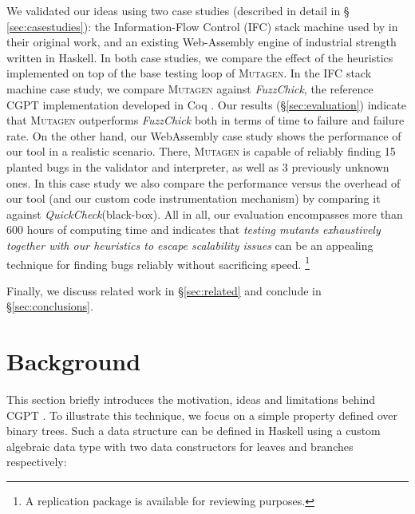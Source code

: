 \documentclass[sigconf,review,anonymous]{acmart}
\newcommand{\quickcheck}{\textit{QuickCheck}\xspace}
\newcommand{\fuzzchick}{\textit{FuzzChick}\xspace}
\newcommand{\mutagen}{\textsc{Mutagen}\xspace}
\begin{document}
We validated our ideas using two case studies (described in detail in \S
\ref{sec:casestudies}): the Information-Flow Control (IFC) stack machine used by
\citeauthor{lampropoulos2019coverage} in their original work, and an existing
{Web-Assembly} engine of industrial strength written in Haskell.
%
In both case studies, we compare the effect of the heuristics implemented on top
of the base testing loop of \mutagen.
%
In the IFC stack machine case study, we compare \mutagen against \fuzzchick, the
reference CGPT implementation developed in Coq \cite{lampropoulos2019coverage}.
%
Our results (\S \ref{sec:evaluation}) indicate that \mutagen outperforms
\fuzzchick both in terms of time to failure and failure rate.
%
On the other hand, our WebAssembly case study shows the performance of our tool
in a realistic scenario.
%
There, \mutagen is capable of reliably finding 15 planted bugs in the validator
and interpreter, as well as 3 previously unknown ones.
%
In this case study we also compare the performance versus the overhead of our
tool (and our custom code instrumentation mechanism) by comparing it against
\quickcheck (black-box).  
%
All in all, our evaluation encompasses more than 600 hours of computing time and
indicates that \emph{testing mutants exhaustively together with our heuristics
to escape scalability issues} can be an appealing technique for finding bugs
reliably without sacrificing speed.%
%
\footnote{A replication package \cite{anon_2021} is available for reviewing
  purposes.}

Finally, we discuss related work in \S \ref{sec:related} and conclude
in \S \ref{sec:conclusions}.



\section{Background}
\label{sec:background}

This section briefly introduces the motivation, ideas and limitations behind
CGPT \cite{lampropoulos2019coverage}.
%
To illustrate this technique, we focus on a simple property defined over binary
trees.
%
Such a data structure can be defined in Haskell using a custom algebraic data
type with two data constructors for leaves and branches respectively:
\end{document}

